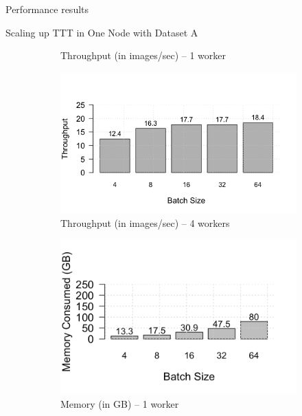 \begin{section}{Performance results}
\begin{subsection}{Scaling up TTT in One Node with Dataset A}
\begin{figure}[t]
\begin{subfigure}[t]{0.45\textwidth}
		\caption{Throughput (in images/sec) -- 1 worker}
		\label{fig:singlenodethroughput1w}
	\end{subfigure} 
	\begin{subfigure}[t]{0.45\textwidth}
		\centering
		\includegraphics[width=\textwidth]{wgrid_figure3c.png}
		\caption{Throughput (in images/sec) -- 4 workers}
		\label{fig:singlenodethroughput4w}
	\end{subfigure}
			\begin{subfigure}[t]{0.45\textwidth}
				\includegraphics[width=\textwidth]{wgrid_figure3b.png}
				\caption{Memory (in GB) -- 1 worker}
				\label{fig:singlenodememutil1w}
			\end{subfigure}
			\begin{subfigure}[t]{0.45\textwidth}

\end{subfigure}
\end{figure}
\end{subsection}
\end{section}

